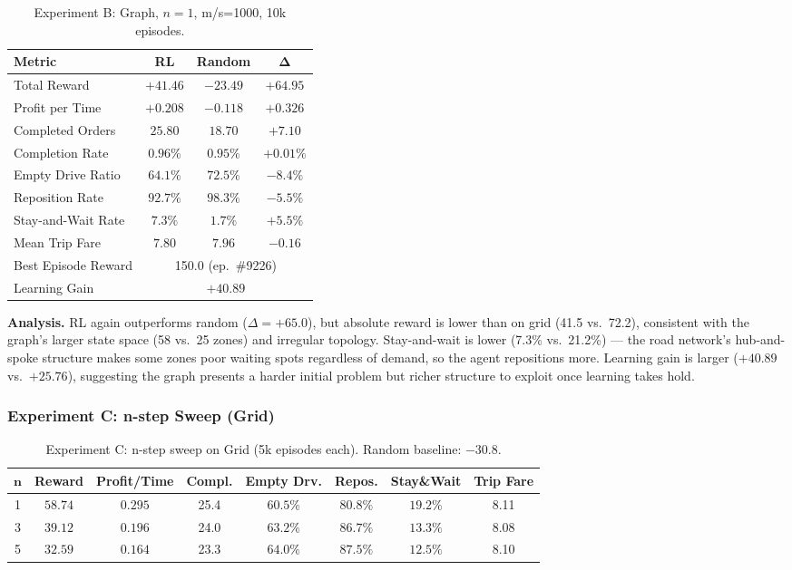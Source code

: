 \begin{table}[ht]
\centering
\caption{Experiment B: Graph, $n{=}1$, m/s{=}1000, 10k episodes.}
\label{tab:res-b}
\begin{tabular}{lccc}
\toprule
\textbf{Metric} & \textbf{RL} & \textbf{Random} & $\bm{\Delta}$ \\
\midrule
Total Reward          & $+41.46$ & $-23.49$ & $+64.95$ \\
Profit per Time       & $+0.208$ & $-0.118$ & $+0.326$ \\
Completed Orders      & $25.80$  & $18.70$  & $+7.10$ \\
Completion Rate       & $0.96\%$ & $0.95\%$ & $+0.01\%$ \\
Empty Drive Ratio     & $64.1\%$ & $72.5\%$ & $-8.4\%$ \\
Reposition Rate       & $92.7\%$ & $98.3\%$ & $-5.5\%$ \\
Stay-and-Wait Rate    & $7.3\%$  & $1.7\%$  & $+5.5\%$ \\
Mean Trip Fare        & $7.80$   & $7.96$   & $-0.16$ \\
\midrule
Best Episode Reward   & \multicolumn{3}{c}{150.0 (ep.\ \#9226)} \\
Learning Gain         & \multicolumn{3}{c}{$+40.89$} \\
\bottomrule
\end{tabular}
\end{table}

\textbf{Analysis.} RL again outperforms random ($\Delta{=}{+}65.0$), but absolute reward is lower than on grid (41.5 vs.\ 72.2), consistent with the graph's larger state space (58 vs.\ 25 zones) and irregular topology. Stay-and-wait is lower (7.3\% vs.\ 21.2\%) — the road network's hub-and-spoke structure makes some zones poor waiting spots regardless of demand, so the agent repositions more. Learning gain is larger ($+40.89$ vs.\ $+25.76$), suggesting the graph presents a harder initial problem but richer structure to exploit once learning takes hold.

\subsubsection{Experiment C: n-step Sweep (Grid)}

\begin{table}[ht]
\centering
\caption{Experiment C: n-step sweep on Grid (5k episodes each). Random baseline: ${-}30.8$.}
\label{tab:res-c}
\begin{tabular}{cccccccc}
\toprule
$\bm{n}$ & \textbf{Reward} & \textbf{Profit/Time} & \textbf{Compl.} & \textbf{Empty Drv.} & \textbf{Repos.} & \textbf{Stay\&Wait} & \textbf{Trip Fare} \\
\midrule
1 & $\mathbf{58.74}$ & $\mathbf{0.295}$ & 25.4 & $60.5\%$ & $80.8\%$ & $19.2\%$ & 8.11 \\
3 & $39.12$ & $0.196$ & 24.0 & $63.2\%$ & $86.7\%$ & $13.3\%$ & 8.08 \\
5 & $32.59$ & $0.164$ & 23.3 & $64.0\%$ & $87.5\%$ & $12.5\%$ & 8.10 \\
\bottomrule
\end{tabular}
\end{table}

